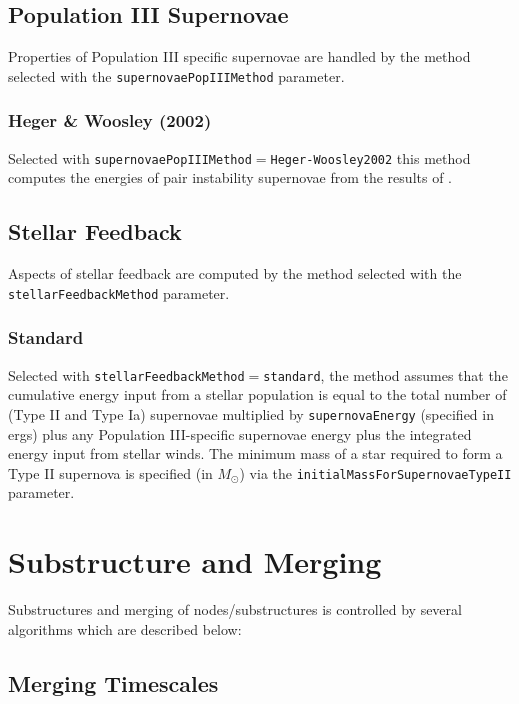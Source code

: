 \subsection{Population III Supernovae}

Properties of Population III specific supernovae are handled by the method selected with the {\tt supernovaePopIIIMethod} parameter.

\subsubsection{Heger \& Woosley (2002)}

Selected with {\tt supernovaePopIIIMethod}$=${\tt Heger-Woosley2002} this method computes the energies of pair instability supernovae from the results of \cite{heger_nucleosynthetic_2002}.

\subsection{Stellar Feedback}

Aspects of stellar feedback are computed by the method selected with the {\tt stellarFeedbackMethod} parameter.

\subsubsection{Standard}

Selected with {\tt stellarFeedbackMethod}$=${\tt standard}, the method assumes that the cumulative energy input from a stellar population is equal to the total number of (Type II and Type Ia) supernovae multiplied by {\tt supernovaEnergy} (specified in ergs) plus any Population III-specific supernovae energy plus the integrated energy input from stellar winds. The minimum mass of a star required to form a Type II supernova is specified (in $M_\odot$) via the {\tt initialMassForSupernovaeTypeII} parameter.

\section{Substructure and Merging}

Substructures and merging of nodes/substructures is controlled by several algorithms which are described below:

\subsection{Merging Timescales}\label{sec:SatelliteMergingTimescales}

